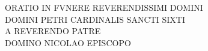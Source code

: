 \documentclass[a5paper,twoside]{article}
\begin{document}
\frenchspacing

\fontsize{11}{13.2}
\selectfont

\linespread{1.1}

\thispagestyle{empty}


\beginnumbering
\autopar


\pstart

\vspace*{2cm}

{\centering

\noindent ORATIO IN FVNERE REVERENDISSIMI DOMINI \\
DOMINI PETRI CARDINALIS SANCTI SIXTI \\
 A REVERENDO PATRE \\
DOMINO NICOLAO 
EPISCOPO \\

}

\pend

\bigskip

\vspace*{\fill}




\end{document}
